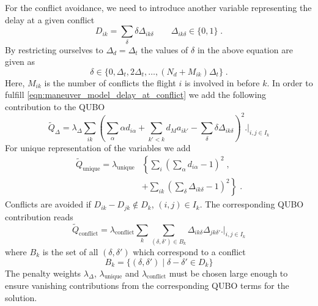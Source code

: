 \documentclass[aps,pra,twocolumn,10pt]{revtex4-1}
\begin{document}
For the conflict avoidance, we need to introduce another variable representing the delay at a given conflict
\begin{equation*}
    D_{ik} = \sum_\delta \delta \Delta_{ik\delta} \qquad \Delta_{ik\delta} \in \{0, 1\} \; .
\end{equation*}
By restricting ourselves to $\Delta_d = \Delta_t$ the values of $\delta$ in the above equation are given as
\begin{equation*}
    \delta \in \{0, \Delta_t, 2\Delta_t, \dots,  (N_d + M_{ik}) \Delta_t\} \; .
\end{equation*}
Here, $M_{ik}$ is the number of conflicts the flight $i$ is involved in before $k$.
In order to fulfill \eqref{eqn:maneuver_model_delay_at_conflict} we add the following contribution to the QUBO
\begin{equation*}
    \tilde Q_\Delta = \lambda_\Delta \sum_{ik}  \left( \sum_{\alpha} \alpha d_{i\alpha}  + \sum_{k'<k} d_M a_{ik'} - \sum_\delta \delta \Delta_{ik\delta}\right)^2 \biggl. \biggr|_{i, j \in I_k}
\end{equation*}
For unique representation of the variables we add 
\begin{align*}
    \tilde Q_\text{unique} = \lambda_\text{unique} & \left\{  \sum_i \left( \sum_\alpha d_{i\alpha} - 1 \right)^2 \right. \; , \\
                      & \left. + \sum_{ik} \left( \sum_\delta \Delta_{ik\delta} - 1 \right)^2 \right\} \; .
\end{align*}
Conflicts are avoided if $D_{ik} - D_{jk} \notin D_k$, $(i, j) \in I_k$. 
The corresponding QUBO contribution reads
\begin{equation*}
    \tilde Q_\text{conflict} = \lambda_\text{conflict} \sum_k \sum_{(\delta, \delta') \in B_k} \Delta_{ik\delta} \Delta_{jk\delta'} \biggl. \biggr|_{i, j \in I_k}
\end{equation*}
where $B_k$ is the set of all $(\delta, \delta')$ which correspond to a conflict
\begin{equation*}
    B_k = \{(\delta, \delta') \; | \; \delta - \delta' \in D_k\}
\end{equation*}
The penalty weights $\lambda_\Delta$, $\lambda_\text{unique}$ and $\lambda_\text{conflict}$ must be chosen large enough to ensure vanishing contributions from the corresponding QUBO terms for the solution.
\end{document}
